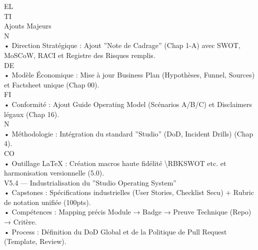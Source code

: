 \documentclass[12pt,landscape,a4paper]{article}
\begin{document}
\vspace{0.5em}
EL\\
TI\\
Ajouts Majeurs\\
\vspace{0.5em}
\vspace{0.5em}
\vspace{0.5em}
\vspace{0.5em}
N\\
• Direction Stratégique : Ajout ”Note de Cadrage” (Chap 1-A) avec SWOT, MoSCoW, RACI et Registre des Risques remplis.\\
\vspace{0.5em}
\vspace{0.5em}
\vspace{0.5em}
\vspace{0.5em}
DE\\
• Modèle Économique : Mise à jour Business Plan (Hypothèses, Funnel, Sources) et Factsheet unique (Chap 00).\\
\vspace{0.5em}
\vspace{0.5em}
\vspace{0.5em}
\vspace{0.5em}
FI\\
• Conformité : Ajout Guide Operating Model (Scénarios A/B/C) et Disclaimers légaux (Chap 16).\\
\vspace{0.5em}
\vspace{0.5em}
\vspace{0.5em}
N\\
• Méthodologie : Intégration du standard ”Studio” (DoD, Incident Drills) (Chap 4).\\
CO\\
• Outillage LaTeX : Création macros haute fidélité \textbackslash{}RBKSWOT etc. et harmonisation versionnelle (5.0).\\
\vspace{0.5em}
\vspace{0.5em}
\vspace{0.5em}
V5.4 — Industrialisation du ”Studio Operating System”\\
• Capstones : Spécifications industrielles (User Stories, Checklist Secu) + Rubric de notation unifiée (100pts).\\
• Compétences : Mapping précis Module → Badge → Preuve Technique (Repo) → Critère.\\
• Process : Définition du DoD Global et de la Politique de Pull Request (Template, Review).\\
\end{document}
